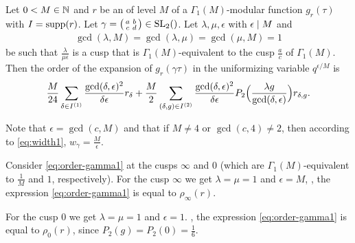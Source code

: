 \documentclass{article}
\begin{document}
\begin{AdditionalInformation}
\begin{Lemma}
  \label{thm:matrixEtaOrderRobins}
  \cite[Thm~4]{Robins_GeneralizedDedekindEtaProducts_1994}
  Let $0<M\in\mathbb{N}$ and $r$ be an  of level
  $M$ of a $\Gamma_1(M)$-modular function $g_r(\tau)$ with
  $I = \operatorname{supp}(r)$.
  Let
  $\gamma=\left(\begin{smallmatrix}a&b\\c&d\end{smallmatrix}\right)\in\SL2Z$.
  Let
  $\lambda,\mu,\epsilon$ with $\epsilon \mid M$ and
  \begin{gather}
    \gcd(\lambda,M)=\gcd(\lambda,\mu)=\gcd(\mu,M)=1
  \end{gather}
  be such that
  $\frac{\lambda}{\mu\epsilon}$ is a cusp that is
  $\Gamma_1(M)$-equivalent to the cusp $\frac{a}{c}$ of $\Gamma_1(M)$.
  Then the order of the expansion of $g_r(\gamma\tau)$ in the
  uniformizing variable $q^{\epsilon/M}$ is
  \begin{gather}
    \frac{M}{24} \sum_{\delta\in I^{(1)}}
    \frac{\gcd(\delta,\epsilon)^2}{\delta\epsilon} r_\delta +
    \frac{M}{2} \sum_{(\delta,g)\in I^{(2)}}
    \frac{\gcd(\delta,\epsilon)^2}{\delta\epsilon} P_2\Bigl(\frac{\lambda
      g}{\gcd(\delta,\epsilon)}\Bigr) r_{\delta,g}.
    \label{eq:order-gamma1}
  \end{gather}
\end{Lemma}

Note that $\epsilon = \gcd(c, M)$ and that if $M\ne4$ or
$\gcd(c,4)\ne2$, then according to \eqref{eq:width1},
$w_\gamma=\frac{M}{\epsilon}$.

Consider \eqref{eq:order-gamma1} at the cusps $\infty$ and
$0$ (which are $\Gamma_1(M)$-equivalent to $\frac{1}{M}$ and $1$,
respectively).
%
For the cusp $\infty$ we get $\lambda=\mu=1$ and $\epsilon=M$, \ie,
the expression \eqref{eq:order-gamma1} is equal to $\rho_\infty(r)$.

For the cusp $0$ we get $\lambda=\mu=1$ and $\epsilon=1$. \ie, the
expression \eqref{eq:order-gamma1} is equal to $\rho_0(r)$, since
$P_2(g)=P_2(0)=\frac{1}{6}$.

\end{AdditionalInformation}
\end{document}
